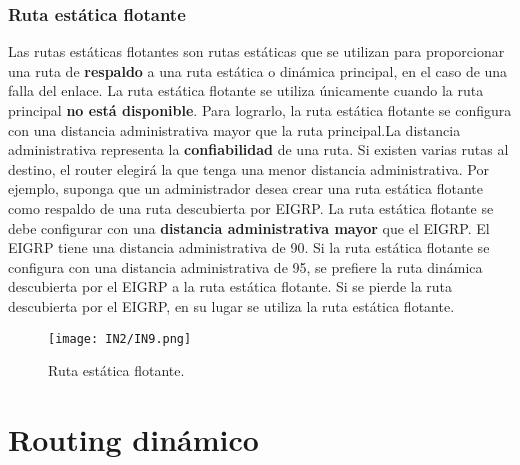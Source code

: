 \documentclass[
	12pt, %
	fleqn, %
	a4paper, %
	oneside, %
]{LegrandOrangeBook}
\begin{document}
\subsubsection*{Ruta estática flotante}
Las rutas estáticas flotantes son rutas estáticas que se utilizan para proporcionar una ruta de \textbf{respaldo} a una ruta estática o dinámica principal, en el caso de una falla del enlace. La ruta estática flotante se utiliza únicamente cuando la ruta principal \textbf{no está disponible}. Para lograrlo, la ruta estática flotante se configura con una distancia administrativa mayor que la ruta principal.La distancia administrativa representa la \textbf{confiabilidad} de una ruta. Si existen varias rutas al destino, el router elegirá la que tenga una menor distancia administrativa. Por ejemplo, suponga que un administrador desea crear una ruta estática flotante como respaldo de una ruta descubierta por EIGRP. La ruta estática flotante se debe configurar con una \textbf{distancia administrativa mayor} que el EIGRP. El EIGRP tiene una distancia administrativa de 90. Si la ruta estática flotante se configura con una distancia administrativa de 95, se prefiere la ruta dinámica descubierta por el EIGRP a la ruta estática flotante. Si se pierde la ruta descubierta por el EIGRP, en su lugar se utiliza la ruta estática flotante.
\begin{figure}[H]
\centering
\texttt{[image: IN2/IN9.png]}
\caption{Ruta estática flotante.}
\end{figure}
\section{Routing dinámico}
\end{document}
